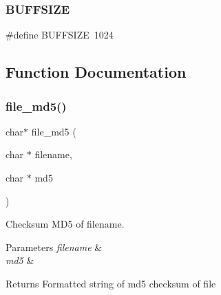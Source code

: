 \subsubsection{B\+U\+F\+F\+S\+I\+ZE}
{\footnotesize\ttfamily \#define B\+U\+F\+F\+S\+I\+ZE~1024}



\subsection{Function Documentation}
\mbox{\label{md5_8c_adaa982699055a63eb33d040e7d13f965}} 
\subsubsection{file\+\_\+md5()}
{\footnotesize\ttfamily char$\ast$ file\+\_\+md5 (\begin{DoxyParamCaption}\item[{char $\ast$}]{filename,  }\item[{char $\ast$}]{md5 }\end{DoxyParamCaption})}



Checksum M\+D5 of filename. 


\begin{DoxyParams}{Parameters}
{\em filename} & \\
\hline
{\em md5} & \\
\hline
\end{DoxyParams}
\begin{DoxyReturn}{Returns}
Formatted string of md5 checksum of file 
\end{DoxyReturn}
